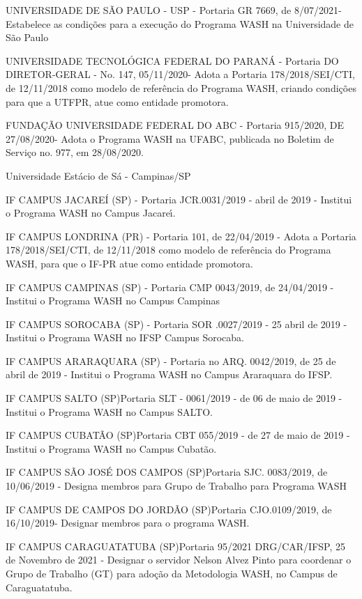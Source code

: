 \documentclass[
12pt,		%
openright,	%
twoside,  %
a4paper,			%
chapter=TITLE,		%
english,			%
french,				%
spanish,			%
brazil				%
]{USPSC-classe/USPSC}
\begin{document}
\begin{alineas}
\item UNIVERSIDADE DE S\~AO PAULO - USP - Portaria GR 7669, de 8/07/2021- Estabelece as condi\c{c}\~oes para a execu\c{c}\~ao do Programa WASH na Universidade de S\~ao Paulo
\item UNIVERSIDADE TECNOL\'OGICA FEDERAL DO PARAN\'A - Portaria DO DIRETOR-GERAL - No. 147, 05/11/2020- Adota a Portaria 178/2018/SEI/CTI, de 12/11/2018 como modelo de refer\^encia do Programa WASH, criando condi\c{c}\~oes para que a UTFPR, atue como entidade promotora.
\item FUNDA\c{C}\~AO UNIVERSIDADE FEDERAL DO ABC - Portaria 915/2020, DE 27/08/2020- Adota o Programa WASH na UFABC, publicada no Boletim de Servi\c{c}o no. 977, em 28/08/2020.
\item Universidade Est\'acio de S\'a - Campinas/SP
\item IF CAMPUS JACARE\'I (SP) - Portaria JCR.0031/2019 -  abril de 2019 - Institui o Programa WASH no Campus Jacare\'{\i}.
\item IF CAMPUS LONDRINA (PR) - Portaria 101, de 22/04/2019 - Adota a Portaria 178/2018/SEI/CTI, de 12/11/2018 como modelo de refer\^encia do Programa WASH, para que o IF-PR atue como entidade promotora.
\item IF CAMPUS CAMPINAS (SP) - Portaria CMP 0043/2019, de 24/04/2019 - Institui o Programa WASH no Campus Campinas
\item IF CAMPUS SOROCABA  (SP) - Portaria SOR .0027/2019 - 25 abril de 2019 - Institui o Programa WASH no IFSP Campus Sorocaba.
\item IF CAMPUS ARARAQUARA (SP) - Portaria no ARQ. 0042/2019, de 25 de abril de 2019 - Institui o Programa WASH no Campus Araraquara do IFSP.
\item IF CAMPUS SALTO (SP)Portaria SLT - 0061/2019 - de 06 de maio de 2019 - Institui o Programa WASH no Campus SALTO.
\item IF CAMPUS CUBAT\~AO (SP)Portaria CBT 055/2019 - de 27 de maio de 2019 - Institui o Programa WASH no Campus Cubat\~ao. 
\item IF CAMPUS S\~AO JOS\'E DOS CAMPOS (SP)Portaria  SJC. 0083/2019, de 10/06/2019 - Designa membros para Grupo de Trabalho para Programa WASH
\item IF CAMPUS DE CAMPOS DO JORD\~AO (SP)Portaria CJO.0109/2019, de 16/10/2019- Designar membros para o programa WASH. 
\item IF CAMPUS CARAGUATATUBA (SP)Portaria 95/2021 DRG/CAR/IFSP, 25 de Novembro de 2021 - Designar o servidor Nelson Alvez Pinto para coordenar o Grupo de Trabalho (GT) para ado\c{c}\~ao da Metodologia WASH, no Campus de Caraguatatuba. 
\end{alineas}
\end{document}

